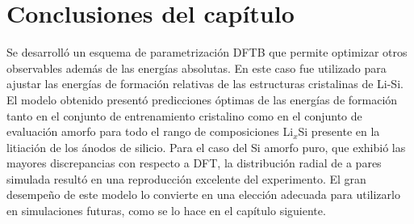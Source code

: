 \section{Conclusiones del capítulo}

Se desarrolló un esquema de parametrización DFTB que permite optimizar otros 
observables además de las energías absolutas. En este caso fue utilizado para 
ajustar las energías de formación relativas de las estructuras cristalinas de 
Li-Si. El modelo obtenido presentó predicciones óptimas de las energías de 
formación tanto en el conjunto de entrenamiento cristalino como en el conjunto 
de evaluación amorfo para todo el rango de composiciones Li$_x$Si presente en 
la litiación de los ánodos de silicio. Para el caso del Si amorfo puro, que 
exhibió las mayores discrepancias con respecto a DFT, la distribución radial de 
a pares simulada resultó en una reproducción excelente del experimento. El gran
desempeño de este modelo lo convierte en una elección adecuada para utilizarlo
en simulaciones futuras, como se lo hace en el capítulo siguiente.
